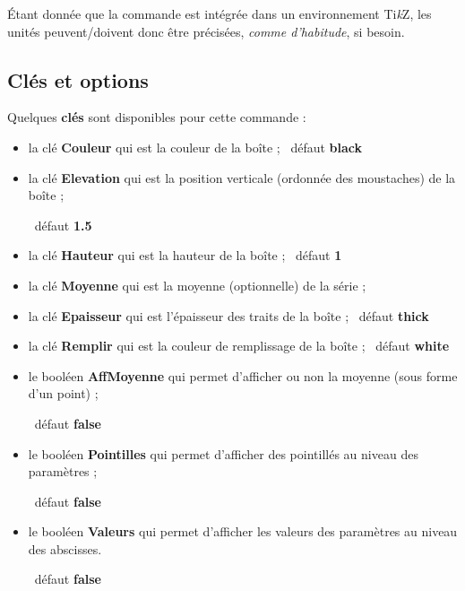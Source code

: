 \documentclass[a4paper,french,11pt]{article}
\providecommand\tikzlogo{Ti\textit{k}Z}
\let\TikZ\tikzlogo
\newcommand\Cle[1]{{\bfseries\sffamily\textlangle \textcolor{orange!75!black}{#1}\textrangle}}
\begin{document}
\begin{PresCodePL}{}
\end{PresCodePL}

\begin{noteblock}
Étant donnée que la commande est intégrée dans un environnement \TikZ, les unités peuvent/doivent donc être précisées, \textit{comme d'habitude}, si besoin.
\end{noteblock}

\subsection{Clés et options}

\begin{cautionblock}
Quelques \Cle{clés} sont disponibles pour cette commande :

\begin{itemize}
	\item la clé \Cle{Couleur} qui est la couleur de la boîte ; \hfill~défaut \Cle{black}
	\item la clé \Cle{Elevation} qui est la position verticale (ordonnée des moustaches) de la boîte ;
	
	\hfill~défaut \Cle{1.5}
	\item la clé \Cle{Hauteur} qui est la hauteur de la boîte ; \hfill~défaut \Cle{1}
	\item la clé \Cle{Moyenne} qui est la moyenne (optionnelle) de la série ;
	\item la clé \Cle{Epaisseur} qui est l'épaisseur des traits de la boîte ; \hfill~défaut \Cle{thick}
	\item la clé \Cle{Remplir} qui est la couleur de remplissage de la boîte ; \hfill~défaut \Cle{white}
	\item le booléen \Cle{AffMoyenne} qui permet d'afficher ou non la moyenne (sous forme d'un point) ;
	
	\hfill~défaut \Cle{false}
	\item le booléen \Cle{Pointilles} qui permet d'afficher des pointillés au niveau des paramètres ;
	
	\hfill~défaut \Cle{false}
	\item le booléen \Cle{Valeurs} qui permet d'afficher les valeurs des paramètres au niveau des abscisses.
	
	\hfill~défaut \Cle{false}
\end{itemize}
\vspace*{-\baselineskip}\leavevmode
\end{cautionblock}
\end{document}
